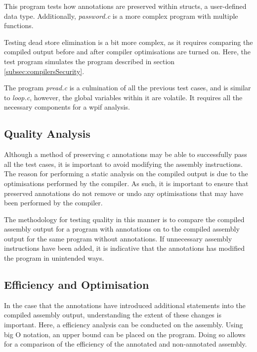 This program tests how annotations are preserved within structs, a user-defined data type. Additionally, \textit{password.c} is a more complex program with multiple functions.

Testing dead store elimination is a bit more complex, as it requires comparing the compiled output before and after compiler optimisations are turned on. Here, the test program simulates the program described in section \ref{subsec:compilersSecurity}.

The program \textit{pread.c} is a culmination of all the previous test cases, and is similar to \textit{loop.c}, however, the global variables within it are volatile. It requires all the necessary components for a wpif analysis.

\subsection{Quality Analysis}
\label{subsec:qualityAnalysis}
Although a method of preserving c annotations may be able to successfully pass all the test cases, it is important to avoid modifying the assembly instructions. The reason for performing a static analysis on the compiled output is due to the optimisations performed by the compiler. As such, it is important to ensure that preserved annotations do not remove or undo any optimisations that may have been performed by the compiler. 

The methodology for testing quality in this manner is to compare the compiled assembly output for a program with annotations on to the compiled assembly output for the same program without annotations. If unnecessary assembly instructions have been added, it is indicative that the annotations has modified the program in unintended ways. 

\subsection{Efficiency and Optimisation}
\label{subsec:runtimeEfficiencyOptimisation}
In the case that the annotations have introduced additional statements into the compiled assembly output, understanding the extent of these changes is important. Here, a efficiency analysis can be conducted on the assembly. Using big O notation, an upper bound can be placed on the program. Doing so allows for a comparison of the efficiency of the annotated and non-annotated assembly. 

